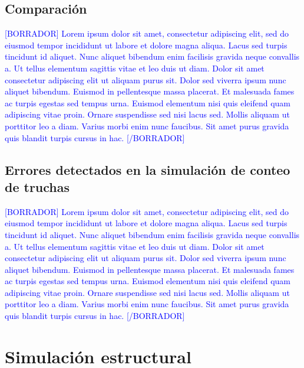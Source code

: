 \subsection{Comparación}

\textcolor{blue}{[BORRADOR] Lorem ipsum dolor sit amet, consectetur adipiscing elit, sed do eiusmod tempor incididunt ut labore et dolore magna aliqua. Lacus sed turpis tincidunt id aliquet. Nunc aliquet bibendum enim facilisis gravida neque convallis a. Ut tellus elementum sagittis vitae et leo duis ut diam. Dolor sit amet consectetur adipiscing elit ut aliquam purus sit. Dolor sed viverra ipsum nunc aliquet bibendum. Euismod in pellentesque massa placerat. Et malesuada fames ac turpis egestas sed tempus urna. Euismod elementum nisi quis eleifend quam adipiscing vitae proin. Ornare suspendisse sed nisi lacus sed. Mollis aliquam ut porttitor leo a diam. Varius morbi enim nunc faucibus. Sit amet purus gravida quis blandit turpis cursus in hac. [/BORRADOR]} 

\subsection{Errores detectados en la simulación de conteo de truchas}

\textcolor{blue}{[BORRADOR] Lorem ipsum dolor sit amet, consectetur adipiscing elit, sed do eiusmod tempor incididunt ut labore et dolore magna aliqua. Lacus sed turpis tincidunt id aliquet. Nunc aliquet bibendum enim facilisis gravida neque convallis a. Ut tellus elementum sagittis vitae et leo duis ut diam. Dolor sit amet consectetur adipiscing elit ut aliquam purus sit. Dolor sed viverra ipsum nunc aliquet bibendum. Euismod in pellentesque massa placerat. Et malesuada fames ac turpis egestas sed tempus urna. Euismod elementum nisi quis eleifend quam adipiscing vitae proin. Ornare suspendisse sed nisi lacus sed. Mollis aliquam ut porttitor leo a diam. Varius morbi enim nunc faucibus. Sit amet purus gravida quis blandit turpis cursus in hac. [/BORRADOR]} 

\section{Simulación estructural}

		

